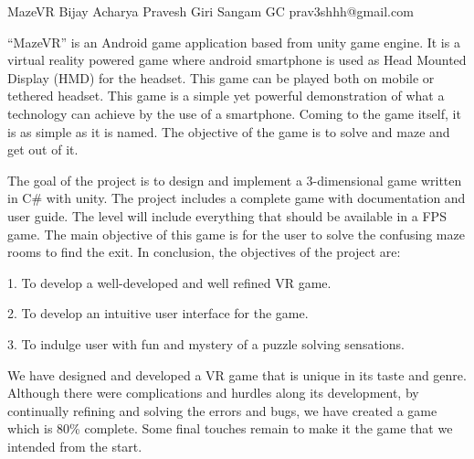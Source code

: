  \begin{conf-abstract}[]
 {MazeVR }
 {Bijay Acharya Pravesh Giri Sangam GC
 }
{prav3shhh@gmail.com}

“MazeVR” is an Android game application based from unity game engine. It is a virtual reality powered game where android smartphone is used as Head Mounted Display (HMD) for the headset. This game can be played both on mobile or tethered headset. This game is a simple yet powerful demonstration of what a technology can achieve by the use of a smartphone. Coming to the game itself, it is as simple as it is named. The objective of the game is to solve and maze and get out of it.

The goal of the project is to design and implement a 3-dimensional game written in C\# with unity. The project includes a complete game with documentation and user guide. The level will include everything that should be available in a FPS game. The main objective of this game is for the user to solve the confusing maze rooms to find the exit. 
In conclusion, the objectives of the project are:

1.	To develop a well-developed and well refined VR game.

2.	To develop an intuitive user interface for the game.

3.	To indulge user with fun and mystery of a puzzle solving sensations.

We have designed and developed a VR game that is unique in its taste and genre. Although there were complications and hurdles along its development, by continually refining and solving the errors and bugs, we have created a game which is 80\% complete. Some final touches remain to make it the game that we intended from the start.
 \end{conf-abstract}